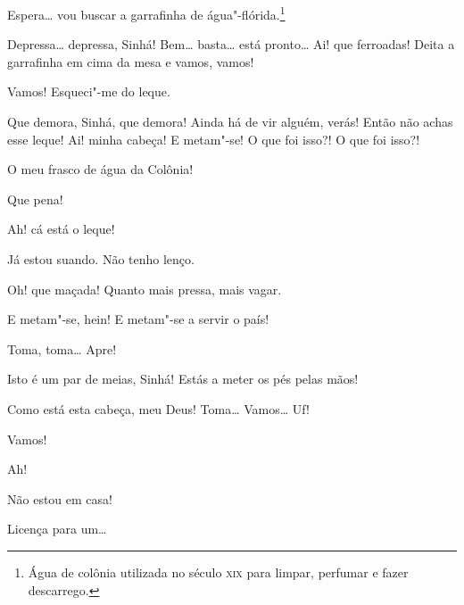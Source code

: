  Espera\ldots{} vou buscar a garrafinha de água"-flórida.\footnote{
Água de colônia utilizada no século \textsc{xix} para limpar, perfumar e fazer
descarrego.}

 Depressa\ldots{} depressa, Sinhá!  Bem\ldots{} basta\ldots{} está
pronto\ldots{} Ai! que ferroadas! Deita a garrafinha em cima da mesa e vamos,
vamos! 

 Vamos!  Esqueci"-me do leque.

  Que demora, Sinhá, que demora!
Ainda há de vir alguém, verás! 
Então não achas esse leque! Ai! minha cabeça! E metam"-se!
 O que foi
isso?! O que foi isso?! 

  O meu frasco de água da Colônia!

  Que pena!

  Ah! cá está o leque! 

 Já estou suando.  Não tenho
lenço.

 Oh! que maçada! Quanto mais pressa, mais vagar. 

 E metam"-se, hein! E metam"-se a servir o país!

  Toma, toma\ldots{} Apre! 

 Isto é um par de meias, Sinhá! Estás a meter os pés pelas
mãos! 

 Como está esta cabeça, meu Deus!  Toma\ldots{} Vamos\ldots{} Uf!

 Vamos! 

 Ah!

  Não estou em casa!

  Licença para
um\ldots{}


